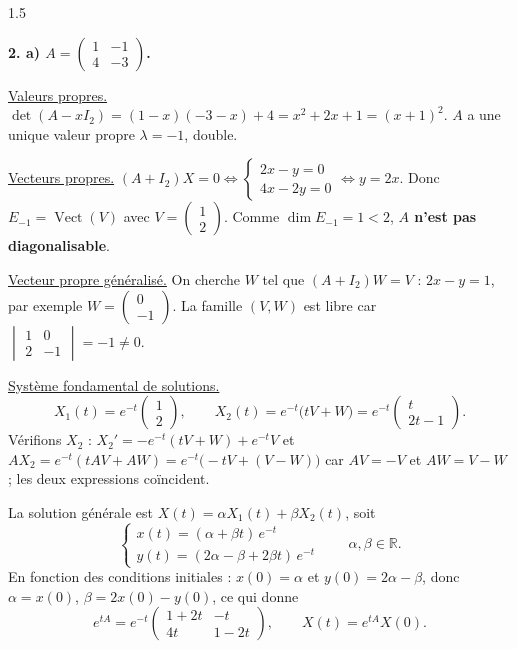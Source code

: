\documentclass[12pt]{article}
\begin{document}
\begin{spacing}{1.5}

\textbf{2. a) $A=\begin{pmatrix}
1 & -1 \\
4 & -3
\end{pmatrix}$.}

\underline{Valeurs propres.} $\det(A-xI_2)=(1-x)(-3-x)+4=x^2+2x+1=(x+1)^2$. $A$ a une unique valeur propre $\lambda=-1$, double.

\underline{Vecteurs propres.} $(A+I_2)X=0\iff\begin{cases}2x-y=0\\4x-2y=0\end{cases}\iff y=2x$. Donc $E_{-1}=\operatorname{Vect}(V)$ avec $V=\begin{pmatrix}1\\2\end{pmatrix}$. Comme $\dim E_{-1}=1<2$, \textbf{$A$ n'est pas diagonalisable}.

\underline{Vecteur propre généralisé.} On cherche $W$ tel que $(A+I_2)W=V$ : $2x-y=1$, par exemple $W=\begin{pmatrix}0\\-1\end{pmatrix}$. La famille $(V,W)$ est libre car $\begin{vmatrix}1&0\\2&-1\end{vmatrix}=-1\neq0$.

\underline{Système fondamental de solutions.}
\[
X_1(t)=e^{-t}\begin{pmatrix}1\\2\end{pmatrix},\qquad
X_2(t)=e^{-t}\big(tV+W\big)=e^{-t}\begin{pmatrix}t\\2t-1\end{pmatrix}.
\]
Vérifions $X_2$ : $X_2'=-e^{-t}(tV+W)+e^{-t}V$ et $AX_2=e^{-t}(tAV+AW)=e^{-t}\big(-tV+(V-W)\big)$ car $AV=-V$ et $AW=V-W$ ; les deux expressions coïncident.

La solution générale est $X(t)=\alpha X_1(t)+\beta X_2(t)$, soit
\[
\begin{cases}
x(t)=(\alpha+\beta t)\,e^{-t}\\
y(t)=(2\alpha-\beta+2\beta t)\,e^{-t}
\end{cases}\qquad \alpha,\beta\in\mathbb{R}.
\]
En fonction des conditions initiales : $x(0)=\alpha$ et $y(0)=2\alpha-\beta$, donc $\alpha=x(0)$, $\beta=2x(0)-y(0)$, ce qui donne
\[
e^{tA}=e^{-t}\begin{pmatrix}1+2t & -t\\ 4t & 1-2t\end{pmatrix},\qquad X(t)=e^{tA}X(0).
\]


\end{spacing}
\end{document}
